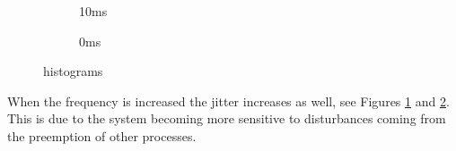 \begin{figure}
  \centering
  \begin{subfigure}{.45\linewidth}
    \centering
   
    
    \caption{10ms}
    \label{fig:10ms}
  \end{subfigure}
  \begin{subfigure}{.45\linewidth}
    \centering

    
    \caption{0ms}
    \label{fig:0ms}
  \end{subfigure}
\caption{histograms}
\label{fig:histograms}
\end{figure}
%   
% 

When the frequency is increased the jitter increases as well, see Figures \ref{fig:10ms} and \ref{fig:0ms}. This is due to the system becoming more sensitive to disturbances coming from the preemption of other processes.
